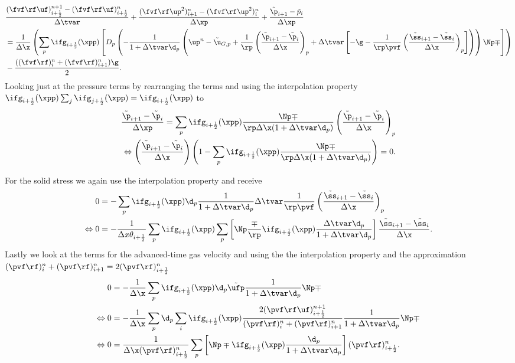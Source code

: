 \begin{align*}
    &\dfrac{(\fvf \rf \uf)_{i+\frac{1}{2}}^{n+1}- (\fvf \rf \uf)_{i+\frac{1}{2}}^{n}}{\Delta \tvar} + \dfrac{(\fvf \rf \up^2)^n_{i+1}-(\fvf \rf \up^2)^n_{i}}{\Delta \xp} + \dfrac{\tilde{\p}_{i+1}-\tilde{p}_i}{\Delta \xp} \\
    &= \dfrac{1}{\Delta \x} \left( \sum_p \ifg_{i+\frac{1}{2}} (\xpp) \left[ D_p \left(- 
    \dfrac{1}{1 + \Delta \tvar \d_p} \left(
    \up^n - \tilde{\u}_{G,p} 
    + \dfrac{1}{\rp} \left(\dfrac{\tilde{\p}_{i+1} - \tilde{\p}_i}{\Delta \x} \right)_p + \Delta \tvar \left[ - \g - \dfrac{1}{\rp \pvf} \left( \dfrac{\tilde{\ss}_{i+1} - \tilde{\ss}_i}{\Delta \x}\right)_p \right] \right) \right) \Np \mp \right] \right)\\
    &-\dfrac{((\fvf \rf)_i^n + (\fvf \rf)_{i+1}^n)\g}{2}.
\end{align*}
Looking just at the pressure terms by rearranging the terms and using the interpolation property $\ifg_{i+\frac{1}{2}} (\xpp) \sum_j \ifg_{j+\frac{1}{2}} (\xpp) = \ifg_{i+\frac{1}{2}} (\xpp)$ to
\begin{align*}
    \dfrac{\tilde{\p}_{i+1}-\tilde{\p}_i}{\Delta \xp} = \sum_p \ifg_{i+\frac{1}{2}} (\xpp) \dfrac{\Np \mp}{\rp \Delta \x (1 + \Delta \tvar \d_p)} \left( \dfrac{\tilde{\p}_{i+1} - \tilde{\p}_i}{\Delta \x} \right)_p \\
\Leftrightarrow \left( \dfrac{\tilde{\p}_{i+1} - \tilde{\p}_i}{\Delta \x} \right)
 \left( 1 - \sum_p \ifg_{i+\frac{1}{2}} (\xpp) \dfrac{\Np \mp}{\rp \Delta \x (1 + \Delta \tvar \d_p)} \right) = 0.
\end{align*}


For the solid stress we again use the interpolation property and receive
\begin{align*}
    0 &= - \sum_p \ifg_{i+\frac{1}{2}} (\xpp) \d_p \dfrac{1}{1+ \Delta \tvar \d_p} \Delta \tvar \dfrac{1}{\rp \pvf} \left( \dfrac{\tilde{\ss}_{i+1} - \tilde{\ss}_{i}}{\Delta \x} \right)_p \\
    \Leftrightarrow
    0 &= - \dfrac{1}{\Delta x \theta_{i+\frac{1}{2}}} \sum_{p} \ifg_{i+\frac{1}{2}} (\xpp) \sum_p \left[ \Np \dfrac{\mp}{\rp} \ifg_{i+\frac{1}{2}} (\xpp) \dfrac{\Delta \tvar \d_p}{1 + \Delta \tvar \d_p}  \right] \dfrac{\tilde{\ss}_{i+1} - \tilde{\ss}_{i}}{\Delta \x}.
\end{align*}
Lastly we look at the terms for the advanced-time gas velocity and using the the interpolation property and the approximation $(\pvf \rf)_i^n + (\pvf \rf)_{i+1}^n = 2 (\pvf \rf)_{i+\frac{1}{2}}^n$
\begin{align*}
    0 &= - \dfrac{1}{\Delta \x} \sum_p \ifg_{i+\frac{1}{2}} ( \xpp ) \d_p \tilde{\ufp} \dfrac{1}{1+\Delta \tvar \d_p} \Np \mp  \\
    \Leftrightarrow 0 &= - \dfrac{1}{\Delta \x} \sum_p \d_p 
    \sum_i \ifg_{i+\frac{1}{2}} (\xpp) \dfrac{2 (\pvf \rf \uf)_{i+\frac{1}{2}}^{n+1}}{(\pvf \rf)_i^n + (\pvf \rf)_{i+1}^n} \dfrac{1}{1+\Delta \tvar \d_p} \Np \mp \\
    \Leftrightarrow 0 &= 
    \dfrac{1}{\Delta \x (\pvf \rf)_{i+\frac{1}{2}}^n} \sum_p \left[ \Np \mp \ifg_{i+\frac{1}{2}} (\xpp) \frac{\d_p}{1+ \Delta \tvar \d_p}\right] (\pvf \rf)_{i+\frac{1}{2}}^n.
\end{align*}

